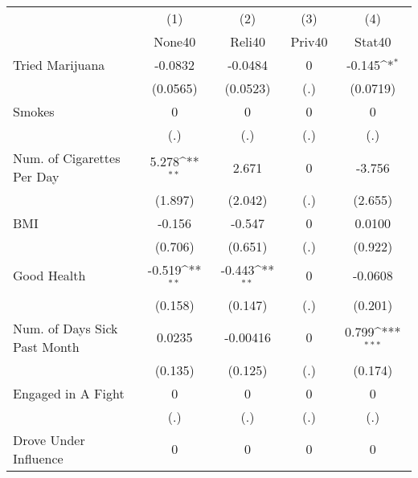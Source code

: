 {
\def\sym#1{\ifmmode^{#1}\else\(^{#1}\)\fi}
\begin{tabular}{l*{4}{c}}
\hline\hline
            &\multicolumn{1}{c}{(1)}&\multicolumn{1}{c}{(2)}&\multicolumn{1}{c}{(3)}&\multicolumn{1}{c}{(4)}\\
            &\multicolumn{1}{c}{None40}&\multicolumn{1}{c}{Reli40}&\multicolumn{1}{c}{Priv40}&\multicolumn{1}{c}{Stat40}\\
\hline
Tried Marijuana&     -0.0832         &     -0.0484         &           0         &      -0.145\sym{*}  \\
            &    (0.0565)         &    (0.0523)         &         (.)         &    (0.0719)         \\
[1em]
Smokes      &           0         &           0         &           0         &           0         \\
            &         (.)         &         (.)         &         (.)         &         (.)         \\
[1em]
Num. of Cigarettes Per Day&       5.278\sym{**} &       2.671         &           0         &      -3.756         \\
            &     (1.897)         &     (2.042)         &         (.)         &     (2.655)         \\
[1em]
BMI         &      -0.156         &      -0.547         &           0         &      0.0100         \\
            &     (0.706)         &     (0.651)         &         (.)         &     (0.922)         \\
[1em]
Good Health &      -0.519\sym{**} &      -0.443\sym{**} &           0         &     -0.0608         \\
            &     (0.158)         &     (0.147)         &         (.)         &     (0.201)         \\
[1em]
Num. of Days Sick Past Month&      0.0235         &    -0.00416         &           0         &       0.799\sym{***}\\
            &     (0.135)         &     (0.125)         &         (.)         &     (0.174)         \\
[1em]
Engaged in A Fight&           0         &           0         &           0         &           0         \\
            &         (.)         &         (.)         &         (.)         &         (.)         \\
[1em]
Drove Under Influence&           0         &           0         &           0         &           0         \\

\end{tabular}}
